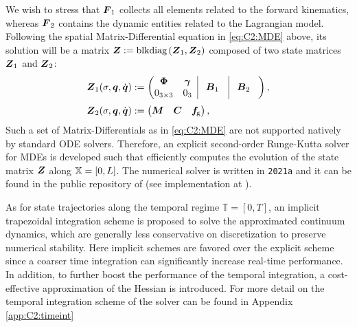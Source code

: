 %
%   
%
We wish to stress that $\boldsymbol{F}_1$ collects all elements related to the forward kinematics, whereas $\boldsymbol{F}_2$ contains the dynamic entities related to the Lagrangian model. Following the spatial Matrix-Differential equation in \eqref{eq:C2:MDE} above, its solution will be a matrix $\boldsymbol{Z} := \text{blkdiag}\left( \boldsymbol{Z}_1, \boldsymbol{Z}_2 \right)$ composed of two state matrices $\boldsymbol{Z}_1$ and $\boldsymbol{Z}_2$:
%
\begin{align}
\mat{Z}_1(\sigma,\q,\dq) & := \begin{pmatrix}
\begin{matrix}
\PhiB  & \gammaB \\ 0_{3\times3} &  0_{3}
\end{matrix} \;\; \vrule & \!\mat{B}_1 & \vrule & \!\mat{B}_2 \;\;\;
 \end{pmatrix}, \\[0.25em]
\mat{Z}_2(\sigma,\q,\dq) & := \begin{pmatrix} \mat{M} & \mat{C} & \mat{f}\!\grav \end{pmatrix},
\end{align}
%
Such a set of Matrix-Differentials as in \eqref{eq:C2:MDE} are not supported natively by standard ODE solvers. Therefore, an explicit second-order Runge-Kutta solver for MDEs is developed such that efficiently computes the evolution of the state matrix $\boldsymbol{Z}$ along $\mathbb{X} = [0,L]$. The numerical solver is written in \matlab \texttt{2021a} and it can be found in the public repository of \sorotoki (see implementation at \cite{SorotokiCode}).

As for state trajectories along the temporal regime $\mathbb{T} = [0,T]$, an implicit trapezoidal integration scheme is proposed to solve the approximated continuum dynamics, which are generally less conservative on discretization to preserve numerical stability. Here implicit schemes are favored over the explicit scheme since a coarser time integration can significantly increase real-time performance. In addition, to further boost the performance of the temporal integration, a cost-effective approximation of the Hessian is introduced. For more detail on the temporal integration scheme of the solver can be found in Appendix \ref{app:C2:timeint}
